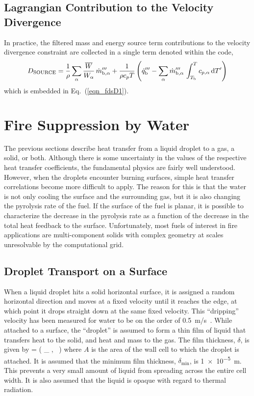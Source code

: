 \subsection{Lagrangian Contribution to the Velocity Divergence}

In practice, the filtered mass and energy source term contributions to the velocity divergence constraint are collected in a single term denoted  within the code,
\begin{equation}
D_{\unit{\tiny SOURCE}} = \frac{1}{\rho} \sum_\alpha \frac{\overline{W}}{W_\alpha} \, \dot{m}_{{\rm b},\alpha}^{\ppp} + \frac{1}{\rho c_p T} \left( \dot{q}_{\rm b}^{\ppp} - \sum_\alpha \dot{m}_{{\rm b},\alpha}^{\ppp} \, \int_{T_{\rm b}}^T c_{p,\alpha} \d T'  \right)
\label{eq:D_SOURCE_vap}
\end{equation}
which is embedded in Eq.~(\ref{eqn_fdsD1}).

\section{Fire Suppression by Water}

The previous sections describe heat transfer from a liquid droplet to a gas, a solid, or both. Although there is some
uncertainty in the values of the respective heat transfer coefficients,
the fundamental physics are fairly well understood. However, when
the droplets encounter burning surfaces,
simple heat transfer correlations become more difficult to apply.
The reason for this is that the water is not only cooling the surface
and the surrounding gas, but it is also changing the pyrolysis rate
of the fuel. If the surface of the fuel is planar, it is possible
to characterize the decrease in the pyrolysis rate as a function of
the decrease in the total heat feedback to the surface. Unfortunately,
most fuels of interest in fire applications are multi-component solids
with complex geometry at scales unresolvable by the computational grid.

\subsection{Droplet Transport on a Surface}

When a liquid droplet hits a solid horizontal surface, it is assigned a
random horizontal direction and moves at a fixed velocity until it
reaches the edge, at which point it drops straight down at the same
fixed velocity. This ``dripping'' velocity has been measured for water to be on
the order of 0.5~m/s~\cite{Hamins:1,Hamins:IAFSS2002}.
While attached to a surface, the ``droplet'' is assumed to form a thin film of liquid that
transfers heat to the solid, and heat and mass to
the gas. The film thickness, $\delta$, is given by
\be
   \delta = \max \left( \delta_{\min} , \sum {} \,  \right)
\ee
where $A$ is the area of the wall cell to which the droplet is attached. It is assumed that the minimum film thickness, $\delta_{\min}$, is \SI{1e-5}{m}. This prevents a very small amount of liquid from spreading across the entire cell width. It is also assumed that the liquid is opaque with regard to thermal radiation.

